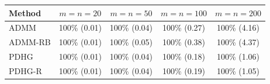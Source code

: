 \begin{tabular}{lcccc}
\toprule
Method & $m=n=20$ & $m=n=50$ & $m=n=100$ & $m=n=200$ \\
\midrule
ADMM & 100\% (0.01) & 100\% (0.04) & 100\% (0.27) & 100\% (4.16) \\
ADMM-RB & 100\% (0.01) & 100\% (0.05) & 100\% (0.38) & 100\% (4.37) \\
PDHG & 100\% (0.01) & 100\% (0.04) & 100\% (0.18) & 100\% (1.06) \\
PDHG-R & 100\% (0.01) & 100\% (0.04) & 100\% (0.19) & 100\% (1.05) \\
\bottomrule
\end{tabular}